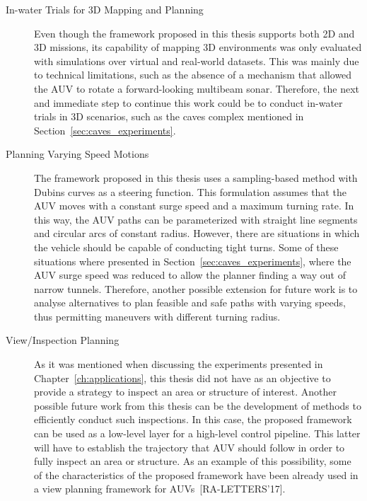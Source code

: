 \begin{description}
\item[In-water Trials for 3D Mapping and Planning] Even though the framework
proposed in this thesis supports both \ac{2D} and \ac{3D} missions, its
capability of mapping \ac{3D} environments was only evaluated with simulations
over virtual and real-world datasets. This was mainly due to technical
limitations, such as the absence of a mechanism that allowed the \ac{AUV} to
rotate a forward-looking multibeam sonar. Therefore, the next and immediate step
to continue this work could be to conduct in-water trials in \ac{3D} scenarios,
such as the caves complex mentioned in Section~\ref{sec:caves_experiments}.

\item[Planning Varying Speed Motions] The framework proposed in this thesis uses
a sampling-based method with Dubins curves as a steering function. This
formulation assumes that the \ac{AUV} moves with a constant surge speed and a
maximum turning rate. In this way, the \ac{AUV} paths can be parameterized with
straight line segments and circular arcs of constant radius. However, there are
situations in which the vehicle should be capable of conducting tight turns.
Some of these situations where presented in Section~\ref{sec:caves_experiments},
where the \ac{AUV} surge speed was reduced to allow the planner finding a way
out of narrow tunnels. Therefore, another possible extension for future work is
to analyse alternatives to plan feasible and safe paths with varying speeds, thus
permitting maneuvers with different turning radius.

\item[View/Inspection Planning] As it was mentioned when discussing the
experiments presented in Chapter~\ref{ch:applications}, this thesis did not have
as an objective to provide a strategy to inspect an area or structure of
interest. Another possible future work from this thesis can be the development
of methods to efficiently conduct such inspections. In this case, the proposed
framework can be used as a low-level layer for a high-level control pipeline.
This latter will have to establish the trajectory that \ac{AUV} should follow in
order to fully inspect an area or structure. As an example of this possibility,
some of the characteristics of the proposed framework have been already used in
a view planning framework for \acp{AUV}~[RA-LETTERS'17].


\end{description}

